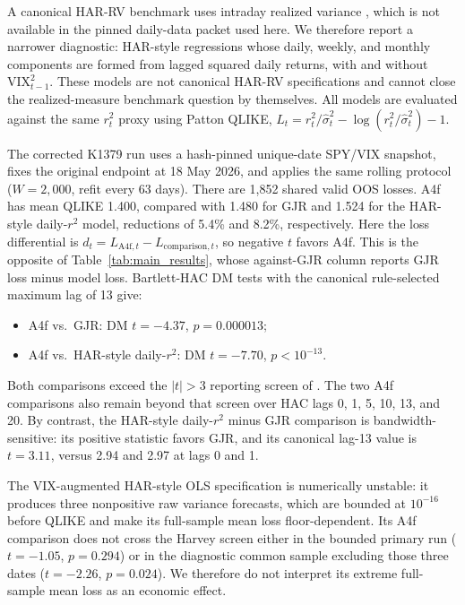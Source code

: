 \documentclass[12pt,a4paper]{article}
\begin{document}
A canonical HAR-RV benchmark uses intraday realized variance \citep{corsi2009}, which is not available in the pinned daily-data packet used here.  We therefore report a narrower diagnostic: HAR-style regressions whose daily, weekly, and monthly components are formed from lagged squared daily returns, with and without $\mathrm{VIX}_{t-1}^2$.  These models are not canonical HAR-RV specifications and cannot close the realized-measure benchmark question by themselves.  All models are evaluated against the same $r_t^2$ proxy using Patton QLIKE, $L_t=r_t^2/\hat\sigma_t^2-\log(r_t^2/\hat\sigma_t^2)-1$.

The corrected K1379 run uses a hash-pinned unique-date SPY/VIX snapshot, fixes the original endpoint at 18 May 2026, and applies the same rolling protocol ($W=2{,}000$, refit every 63 days).  There are 1,852 shared valid OOS losses.  A4f has mean QLIKE 1.400, compared with 1.480 for GJR and 1.524 for the HAR-style daily-$r^2$ model, reductions of 5.4\% and 8.2\%, respectively.  Here the loss differential is $d_t=L_{\mathrm{A4f},t}-L_{\mathrm{comparison},t}$, so negative $t$ favors A4f. This is the opposite of Table~\ref{tab:main_results}, whose against-GJR column reports GJR loss minus model loss. Bartlett-HAC DM tests with the canonical rule-selected maximum lag of 13 give:
\begin{itemize}
  \item A4f vs.\ GJR: DM $t=-4.37$, $p=0.000013$;
  \item A4f vs.\ HAR-style daily-$r^2$: DM $t=-7.70$, $p<10^{-13}$.
\end{itemize}
Both comparisons exceed the $|t|>3$ reporting screen of \citet{harvey2016}.  The two A4f comparisons also remain beyond that screen over HAC lags 0, 1, 5, 10, 13, and 20.  By contrast, the HAR-style daily-$r^2$ minus GJR comparison is bandwidth-sensitive: its positive statistic favors GJR, and its canonical lag-13 value is $t=3.11$, versus 2.94 and 2.97 at lags 0 and 1.

The VIX-augmented HAR-style OLS specification is numerically unstable: it produces three nonpositive raw variance forecasts, which are bounded at $10^{-16}$ before QLIKE and make its full-sample mean loss floor-dependent.  Its A4f comparison does not cross the Harvey screen either in the bounded primary run ($t=-1.05$, $p=0.294$) or in the diagnostic common sample excluding those three dates ($t=-2.26$, $p=0.024$).  We therefore do not interpret its extreme full-sample mean loss as an economic effect.
\end{document}
